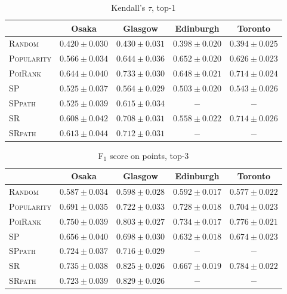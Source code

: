 \begin{table*}[t]
\caption{Kendall's $\tau$, top-1}
\label{tab:tau}
\centering
\begin{tabular}{l|cccc} \hline
 & Osaka & Glasgow & Edinburgh & Toronto \\ \hline
\textsc{Random} & $0.420\pm0.030$ & $0.430\pm0.031$ & $0.398\pm0.020$ & $0.394\pm0.025$ \\
\textsc{Popularity} & $0.566\pm0.034$ & $0.644\pm0.036$ & $\mathbf{0.652\pm0.020}$ & $0.626\pm0.023$ \\
\textsc{PoiRank} & $\mathbf{0.644\pm0.040}$ & $\mathbf{0.733\pm0.030}$ & $\mathit{0.648\pm0.021}$ & $\mathbf{0.714\pm0.024}$ \\
\textsc{SP} & $0.525\pm0.037$ & $0.564\pm0.029$ & $0.503\pm0.020$ & $0.543\pm0.026$ \\
\textsc{SPpath} & $0.525\pm0.039$ & $0.615\pm0.034$ & $-$ & $-$ \\
\textsc{SR} & $0.608\pm0.042$ & $0.708\pm0.031$ & $0.558\pm0.022$ & $\mathit{0.714\pm0.026}$ \\
\textsc{SRpath} & $\mathit{0.613\pm0.044}$ & $\mathit{0.712\pm0.031}$ & $-$ & $-$ \\
\hline
\end{tabular}
\end{table*}


\begin{table*}[t]
\caption{F$_1$ score on points, top-3}
\label{tab:f1}
\centering
\begin{tabular}{l|cccc} \hline
 & Osaka & Glasgow & Edinburgh & Toronto \\ \hline
\textsc{Random} & $0.587\pm0.034$ & $0.598\pm0.028$ & $0.592\pm0.017$ & $0.577\pm0.022$ \\
\textsc{Popularity} & $0.691\pm0.035$ & $0.722\pm0.033$ & $\mathit{0.728\pm0.018}$ & $0.704\pm0.023$ \\
\textsc{PoiRank} & $\mathbf{0.750\pm0.039}$ & $0.803\pm0.027$ & $\mathbf{0.734\pm0.017}$ & $\mathit{0.776\pm0.021}$ \\
\textsc{SP} & $0.656\pm0.040$ & $0.698\pm0.030$ & $0.632\pm0.018$ & $0.674\pm0.023$ \\
\textsc{SPpath} & $0.724\pm0.037$ & $0.716\pm0.029$ & $-$ & $-$ \\
\textsc{SR} & $\mathit{0.735\pm0.038}$ & $\mathit{0.825\pm0.026}$ & $0.667\pm0.019$ & $\mathbf{0.784\pm0.022}$ \\
\textsc{SRpath} & $0.723\pm0.039$ & $\mathbf{0.829\pm0.026}$ & $-$ & $-$ \\
\hline
\end{tabular}
\end{table*}


